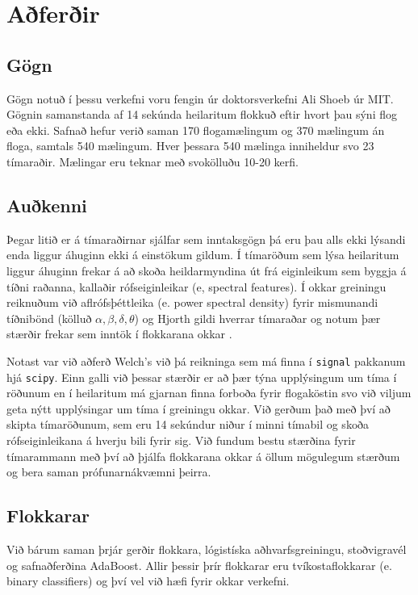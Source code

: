 \documentclass[11pt]{article}
\begin{document}
\section{Aðferðir}
\subsection{Gögn}
Gögn notuð í þessu verkefni voru fengin úr doktorsverkefni Ali Shoeb\cite{Doctorsgrein} úr MIT. Gögnin samanstanda af 14 sekúnda heilaritum flokkuð eftir hvort þau sýni flog eða ekki. Safnað hefur verið saman 170 flogamælingum og 370 mælingum án floga, samtals 540 mælingum. Hver þessara 540 mælinga inniheldur svo 23 tímaraðir. Mælingar eru teknar með svokölluðu 10-20 kerfi\cite{EEG-maeling}.
\subsection{Auðkenni}
Þegar litið er á tímaraðirnar sjálfar sem inntaksgögn þá eru þau alls ekki lýsandi enda liggur áhuginn ekki á einstökum gildum. Í tímaröðum sem lýsa heilaritum liggur áhuginn frekar á að skoða heildarmyndina út frá eiginleikum sem byggja á tíðni raðanna, kallaðir rófseiginleikar (e, spectral features). Í okkar greiningu reiknuðum við aflrófsþéttleika (e. power spectral density) fyrir mismunandi tíðnibönd (kölluð $\alpha, \beta, \delta, \theta$) og Hjorth gildi hverrar tímaraðar og notum þær stærðir frekar sem inntök í flokkarana okkar \cite{Hjorth}. 

Notast var við aðferð Welch's við þá reikninga sem má finna í {\tt signal} pakkanum hjá {\tt scipy}. Einn galli við þessar stærðir er að þær týna upplýsingum um tíma í röðunum en í heilaritum má gjarnan finna forboða fyrir flogaköstin svo við viljum geta nýtt upplýsingar um tíma í greiningu okkar. Við gerðum það með því að skipta tímaröðunum, sem eru 14 sekúndur niður í minni tímabil og skoða rófseiginleikana á hverju bili fyrir sig.
Við fundum bestu stærðina fyrir tímarammann með því að þjálfa flokkarana okkar á öllum mögulegum stærðum og bera saman prófunarnákvæmni þeirra.
\subsection{Flokkarar}
Við bárum saman þrjár gerðir flokkara, lógistíska aðhvarfsgreiningu, stoðvigravél og safnaðferðina AdaBoost. Allir þessir þrír flokkarar eru tvíkostaflokkarar (e. binary classifiers) og því vel við hæfi fyrir okkar verkefni.
\end{document}

